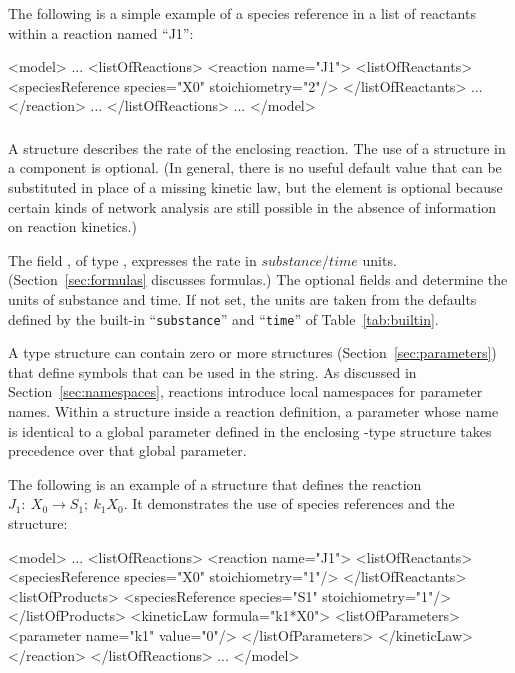 \documentclass[10pt]{cekarticle}
\newcommand{\vref}[1]{\ref{#1}}
\newcommand{\changed}[1]{\textcolor{BrickRed}{#1}}
\begin{document}
The following is a simple example of a \changed{species} reference in a
list of reactants within a reaction named ``J1'':
\begin{example}
<model>
    ...
    <listOfReactions>
        <reaction name="J1">
            <listOfReactants>
                <\changed{speciesReference} \changed{species}="X0" stoichiometry="2"/>
            </listOfReactants>
            ...
        </reaction>
        ...
    </listOfReactions>
    ...
</model>
\end{example}

\subsubsection{}
\label{subsec:kinetic-law}

A  structure describes the rate of the enclosing
reaction.  The use of a  structure in a 
component is optional.  (\changed{In general, there is no useful default
  value that can be substituted in place of a missing kinetic law, but the
  element is optional because certain kinds of network analysis are still
  possible in the absence of information on reaction kinetics.})

The field , of type , expresses the rate in
$substance/time$ units.  (Section~\ref{sec:formulas} discusses formulas.)
The optional fields  and 
determine the units of substance and time.  If not set, the units are taken
from the defaults defined by the built-in ``\texttt{substance}'' and
``\texttt{time}'' of Table~\vref{tab:builtin}.

A  type structure can contain zero or more
 structures (Section~\ref{sec:parameters}) that define
symbols that can be used in the  string.  As discussed in
Section~\ref{sec:namespaces}, reactions introduce local namespaces for
parameter names.  Within a  structure inside a reaction
definition, a parameter whose name is identical to a global parameter
defined in the enclosing -type structure takes precedence over
that global parameter.

The following is an example of a  structure that defines
the reaction $J_1: \ X_0 \longrightarrow S_1; \ k_1 X_0$.  It demonstrates
the use of \changed{species} references and the 
structure:
\begin{example}
<model>
    ...
    <listOfReactions>
        <reaction name="J1">
            <listOfReactants>
                <\changed{speciesReference} \changed{species}="X0" stoichiometry="1"/>
            </listOfReactants>
            <listOfProducts>
                <\changed{speciesReference} \changed{species}="S1" stoichiometry="1"/>
            </listOfProducts>
            <kineticLaw formula="k1*X0">
                <listOfParameters>
                    <parameter name="k1" value="0"/>
                </listOfParameters>
            </kineticLaw>
        </reaction>
    </listOfReactions>
    ...
</model>
\end{example}
\end{document}
